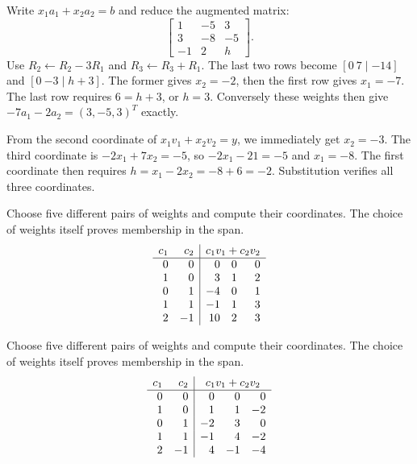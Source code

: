 Write $x_1a_1+x_2a_2=b$ and reduce the augmented matrix:
\[
\left[\begin{array}{rr|r}1&-5&3\\3&-8&-5\\-1&2&h\end{array}\right].
\]
Use $R_2\leftarrow R_2-3R_1$ and $R_3\leftarrow R_3+R_1$.
The last two rows become $[0\ 7\mid-14]$ and $[0\ {-3}\mid h+3]$.
The former gives $x_2=-2$, then the first row gives $x_1=-7$.
The last row requires $6=h+3$, or $h=3$. Conversely these weights
then give $-7a_1-2a_2=(3,-5,3)^T$ exactly.

From the second coordinate of $x_1v_1+x_2v_2=y$, we immediately get
$x_2=-3$. The third coordinate is $-2x_1+7x_2=-5$, so
$-2x_1-21=-5$ and $x_1=-8$. The first coordinate then requires
$h=x_1-2x_2=-8+6=-2$. Substitution verifies all three coordinates.

Choose five different pairs of weights and compute their coordinates. The choice of weights itself proves membership in the span.
\[\begin{array}{rr|rrr}c_1&c_2&\multicolumn{3}{c}{c_1v_1+c_2v_2}\\\hline0&0&0&0&0\\1&0&3&1&2\\0&1&-4&0&1\\1&1&-1&1&3\\2&-1&10&2&3\end{array}\]

Choose five different pairs of weights and compute their coordinates. The choice of weights itself proves membership in the span.
\[\begin{array}{rr|rrr}c_1&c_2&\multicolumn{3}{c}{c_1v_1+c_2v_2}\\\hline0&0&0&0&0\\1&0&1&1&-2\\0&1&-2&3&0\\1&1&-1&4&-2\\2&-1&4&-1&-4\end{array}\]

